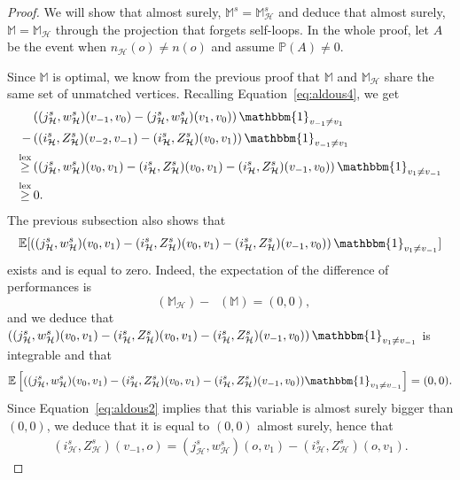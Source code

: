 \documentclass[10pt,a4paper]{amsart}
\DeclareMathOperator{\lex}{lex}
\DeclareMathOperator{\perfV}{perf_V}
\begin{document}
\begin{proof}
We will show that almost surely, $\mathbb{M}^s=\mathbb{M}_{\mathcal{H}}^s$ and deduce that almost surely, $\mathbb{M}=\mathbb{M}_{\mathcal{H}}$ through the projection that forgets self-loops. In the whole proof, let $A$ be the event when $n_{\mathcal{H}}(o)\neq n(o)$ and assume $\mathbb P(A) \neq 0$.


Since $\mathbb{M}$ is optimal, we know from the previous proof that $\mathbb{M}$ and $\mathbb{M}_{\mathcal{H}}$ share the same set of unmatched vertices. 
Recalling Equation~\eqref{eq:aldous4}, we get
\begin{align*}
&\left((j_{\mathcal{H}}^s,w_{\mathcal{H}}^s)(v_{-1},v_0)-(j_{\mathcal{H}}^s,w_{\mathcal{H}}^s)(v_{1},v_0) \right)\mathbbm{1}_{v_{-1} \neq v_1} \\
-&\left((i^s_{\mathcal{H}},Z^s_{\mathcal{H}})(v_{-2},v_{-1}) -(i^s_{\mathcal{H}},Z^s_{\mathcal{H}})(v_{0},v_{1})\right)\mathbbm{1}_{v_{-1} \neq v_1} \\
\overset{\lex}{\geq}&\left((j_{\mathcal{H}}^s,w_{\mathcal{H}}^s)(v_0,v_1)-(i^s_{\mathcal{H}},Z^s_{\mathcal{H}})(v_0,v_1)-(i^s_{\mathcal{H}},Z^s_{\mathcal{H}})(v_{-1},v_0)\right)\mathbbm{1}_{v_1 \neq v_{-1}} \\
\overset{\lex}{\geq} &\,0.
\end{align*}
The previous subsection also shows that
\[
\mathbb{E}[\left((j_{\mathcal{H}}^s,w_{\mathcal{H}}^s)(v_0,v_1)-(i^s_{\mathcal{H}},Z^s_{\mathcal{H}})(v_0,v_1)-(i^s_{\mathcal{H}},Z^s_{\mathcal{H}})(v_{-1},v_0)\right)\mathbbm{1}_{v_1 \neq v_{-1}}]
\]
exists and is equal to zero. Indeed, the expectation of the difference of performances is 
\[
\perfV(\mathbb{M}_{\mathcal{H}})-\perfV(\mathbb{M})=(0,0),
\]
and we deduce that $\left((j_{\mathcal{H}}^s,w_{\mathcal{H}}^s)(v_0,v_1)-(i^s_{\mathcal{H}},Z^s_{\mathcal{H}})(v_0,v_1)-(i^s_{\mathcal{H}},Z^s_{\mathcal{H}})(v_{-1},v_0)\right)\mathbbm{1}_{v_1 \neq v_{-1}}$ is integrable and that
\begin{align*}
\mathbb{E}\left[((j_{\mathcal{H}}^s,w_{\mathcal{H}}^s)(v_0,v_1)-(i^s_{\mathcal{H}},Z^s_{\mathcal{H}})(v_0,v_1)-(i^s_{\mathcal{H}},Z^s_{\mathcal{H}})(v_{-1},v_0))\mathbbm{1}_{v_1 \neq v_{-1}} \right]=(0,0) .
\end{align*}
Since Equation~\ref{eq:aldous2} implies that this variable is almost surely bigger than $(0,0)$, we deduce that it is equal to $(0,0)$ almost surely, hence that
\begin{align}\label{eq:Aldous5}
(i^s_{\mathcal{H}},Z^s_{\mathcal{H}})(v_{-1},o) =(j_{\mathcal{H}}^s,w_{\mathcal{H}}^s)(o,v_1)-(i^s_{\mathcal{H}},Z^s_{\mathcal{H}})(o,v_1).

\end{align}
\end{proof}
\end{document}
